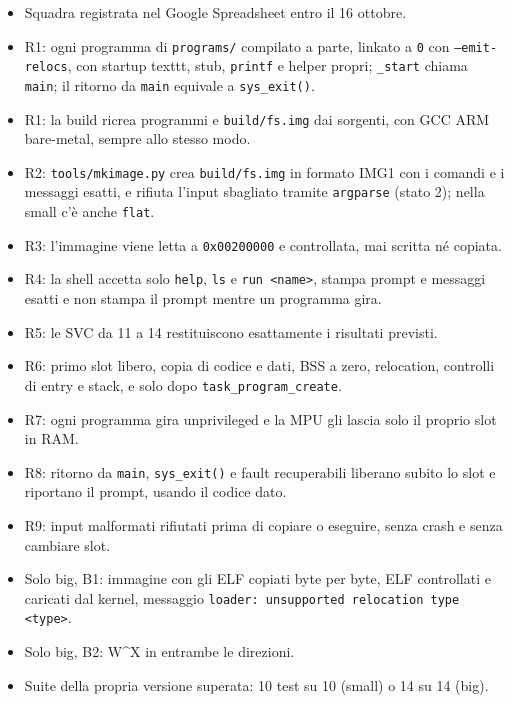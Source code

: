\begin{itemize}\sloppy
    \item[$\square$] Squadra registrata nel Google Spreadsheet entro il 16 ottobre.
    \item[$\square$] R1: ogni programma di \texttt{programs/} compilato a parte, linkato a \texttt{0} con \texttt{--emit-relocs}, con startup texttt, stub, \texttt{printf} e helper propri; \texttt{\_start} chiama \texttt{main}; il ritorno da \texttt{main} equivale a \texttt{sys\_exit()}.
    \item[$\square$] R1: la build ricrea programmi e \texttt{build/fs.img} dai sorgenti, con GCC ARM bare-metal, sempre allo stesso modo.
    \item[$\square$] R2: \texttt{tools/mkimage.py} crea \texttt{build/fs.img} in formato IMG1 con i comandi e i messaggi esatti, e rifiuta l'input sbagliato tramite \texttt{argparse} (stato 2); nella small c'è anche \texttt{flat}.
    \item[$\square$] R3: l'immagine viene letta a \texttt{0x00200000} e controllata, mai scritta né copiata.
    \item[$\square$] R4: la shell accetta solo \texttt{help}, \texttt{ls} e \texttt{run <name>}, stampa prompt e messaggi esatti e non stampa il prompt mentre un programma gira.
    \item[$\square$] R5: le SVC da 11 a 14 restituiscono esattamente i risultati previsti.
    \item[$\square$] R6: primo slot libero, copia di codice e dati, BSS a zero, relocation, controlli di entry e stack, e solo dopo \texttt{task\_program\_create}.
    \item[$\square$] R7: ogni programma gira unprivileged e la MPU gli lascia solo il proprio slot in RAM.
    \item[$\square$] R8: ritorno da \texttt{main}, \texttt{sys\_exit()} e fault recuperabili liberano subito lo slot e riportano il prompt, usando il codice dato.
    \item[$\square$] R9: input malformati rifiutati prima di copiare o eseguire, senza crash e senza cambiare slot.
    \item[$\square$] Solo big, B1: immagine con gli ELF copiati byte per byte, ELF controllati e caricati dal kernel, messaggio \texttt{loader:\ unsupported relocation type <type>}.
    \item[$\square$] Solo big, B2: W\textasciicircum{}X in entrambe le direzioni.
    \item[$\square$] Suite della propria versione superata: 10 test su 10 (small) o 14 su 14 (big).

\end{itemize}
